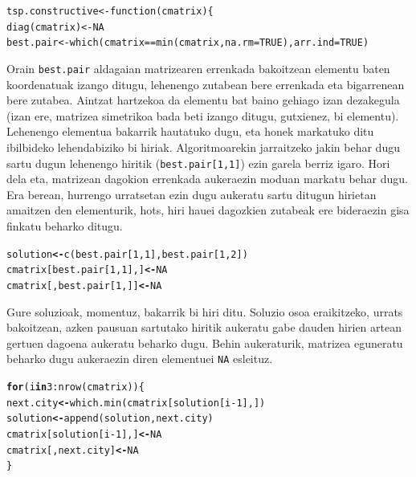 \documentclass[eu]{ifirak}\usepackage[]{graphicx}\usepackage[]{color}
\makeatletter
\newcommand{\hlnum}[1]{\textcolor[rgb]{0.659,0.4,0.051}{#1}}%
\newcommand{\hlopt}[1]{\textcolor[rgb]{0,0,0}{#1}}%
\newcommand{\hlstd}[1]{\textcolor[rgb]{0,0,0}{#1}}%
\newcommand{\hlkwa}[1]{\textcolor[rgb]{0.133,0.224,0.659}{\textbf{#1}}}%
\newcommand{\hlkwb}[1]{\textcolor[rgb]{0.549,0.114,0.412}{\textbf{#1}}}%
\newcommand{\hlkwd}[1]{\textcolor[rgb]{0.659,0.133,0.482}{#1}}%
\newenvironment{kframe}{%
 \def\at@end@of@kframe{}%
 \ifinner\ifhmode%
  \def\at@end@of@kframe{\end{minipage}}%
  \begin{minipage}{\columnwidth}%
 \fi\fi%
 \def\FrameCommand##1{\hskip\@totalleftmargin \hskip-\fboxsep
 \colorbox{shadecolor}{##1}\hskip-\fboxsep
     \hskip-\linewidth \hskip-\@totalleftmargin \hskip\columnwidth}%
 \MakeFramed {\advance\hsize-\width
   \@totalleftmargin\z@ \linewidth\hsize
   \@setminipage}}%
 {\par\unskip\endMakeFramed%
 \at@end@of@kframe}
\newenvironment{knitrout}{}{} %
\newcommand{\code}[1]{\texttt{#1}}
\makeatother
\begin{document}
\begin{knitrout}
\color{fgcolor}\begin{kframe}
\begin{alltt}
tsp.constructive <- \hlkwd{function} (cmatrix) \{
  \hlkwd{diag}(cmatrix) <- NA
  best.pair <- \hlkwd{which}(cmatrix == \hlkwd{min}(cmatrix, na.rm=TRUE), arr.ind=TRUE)
\end{alltt}
\end{kframe}
\end{knitrout}

Orain \code{best.pair} aldagaian matrizearen errenkada bakoitzean elementu baten koordenatuak izango ditugu, lehenengo zutabean bere errenkada eta bigarrenean bere zutabea. Aintzat hartzekoa da elementu bat baino gehiago izan dezakegula (izan ere, matrizea simetrikoa bada beti izango ditugu, gutxienez, bi elementu). Lehenengo elementua bakarrik hautatuko dugu, eta honek markatuko ditu ibilbideko lehendabiziko bi hiriak. Algoritmoarekin jarraitzeko jakin behar dugu sartu dugun lehenengo hiritik (\code{best.pair[1,1]}) ezin garela berriz igaro. Hori dela eta, matrizean dagokion errenkada aukeraezin moduan markatu behar dugu. Era berean, hurrengo urratsetan ezin dugu aukeratu sartu ditugun hirietan amaitzen den elementurik, hots, hiri hauei dagozkien zutabeak ere bideraezin gisa finkatu beharko ditugu.

\begin{knitrout}
\color{fgcolor}\begin{kframe}
\begin{alltt}
  \hlstd{solution} \hlkwb{<-} \hlkwd{c}\hlstd{(best.pair[}\hlnum{1}\hlstd{,} \hlnum{1}\hlstd{], best.pair[}\hlnum{1}\hlstd{,} \hlnum{2}\hlstd{])}
  \hlstd{cmatrix[best.pair[}\hlnum{1}\hlstd{,} \hlnum{1}\hlstd{], ]} \hlkwb{<-} \hlnum{NA}
  \hlstd{cmatrix[, best.pair[}\hlnum{1}\hlstd{, ]]}  \hlkwb{<-} \hlnum{NA}
\end{alltt}
\end{kframe}
\end{knitrout}

Gure soluzioak, momentuz, bakarrik bi hiri ditu. Soluzio osoa eraikitzeko, urrats bakoitzean, azken pausuan sartutako hiritik aukeratu gabe dauden hirien artean gertuen dagoena aukeratu beharko dugu. Behin aukeraturik, matrizea eguneratu beharko dugu aukeraezin diren elementuei \code{NA} esleituz.

\begin{knitrout}
\color{fgcolor}\begin{kframe}
\begin{alltt}
  \hlkwa{for} \hlstd{(i} \hlkwa{in} \hlnum{3}\hlopt{:}\hlkwd{nrow}\hlstd{(cmatrix)) \{}
    \hlstd{next.city} \hlkwb{<-} \hlkwd{which.min}\hlstd{(cmatrix[solution[i} \hlopt{-} \hlnum{1}\hlstd{], ])}
    \hlstd{solution} \hlkwb{<-} \hlkwd{append}\hlstd{(solution, next.city)}
    \hlstd{cmatrix[solution[i} \hlopt{-} \hlnum{1}\hlstd{], ]} \hlkwb{<-} \hlnum{NA}
    \hlstd{cmatrix[, next.city]} \hlkwb{<-} \hlnum{NA}
  \hlstd{\}}
\end{alltt}
\end{kframe}
\end{knitrout}
\end{document}
